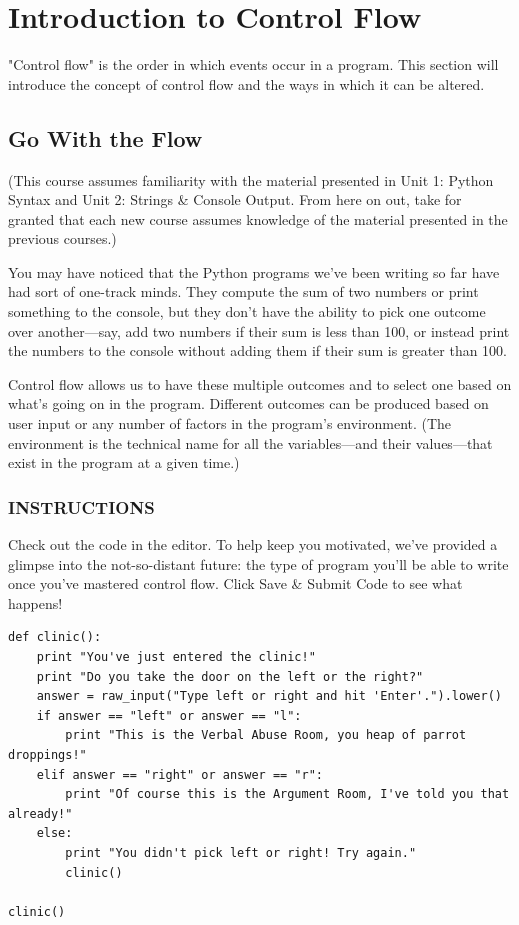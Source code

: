 \documentclass[12pt,a4paper,final,twoside,onecolumn,titlepage]{book}
\begin{document}
\section{Introduction to Control Flow}
"Control flow" is the order in which events occur in a program. This section will introduce the concept of control flow and the ways in which it can be altered.

\subsection{Go With the Flow}

(This course assumes familiarity with the material presented in Unit 1: Python Syntax and Unit 2: Strings \& Console Output. From here on out, take for granted that each new course assumes knowledge of the material presented in the previous courses.)

You may have noticed that the Python programs we've been writing so far have had sort of one-track minds. They compute the sum of two numbers or print something to the console, but they don't have the ability to pick one outcome over another—say, add two numbers if their sum is less than 100, or instead print the numbers to the console without adding them if their sum is greater than 100.

Control flow allows us to have these multiple outcomes and to select one based on what's going on in the program. Different outcomes can be produced based on user input or any number of factors in the program's environment. (The environment is the technical name for all the variables—and their values—that exist in the program at a given time.)

\subsubsection{INSTRUCTIONS}

Check out the code in the editor. To help keep you motivated, we've provided a glimpse into the not-so-distant future: the type of program you'll be able to write once you've mastered control flow. Click Save \& Submit Code to see what happens!

\begin{lstlisting}
def clinic():
    print "You've just entered the clinic!"
    print "Do you take the door on the left or the right?"
    answer = raw_input("Type left or right and hit 'Enter'.").lower()
    if answer == "left" or answer == "l":
        print "This is the Verbal Abuse Room, you heap of parrot droppings!"
    elif answer == "right" or answer == "r":
        print "Of course this is the Argument Room, I've told you that already!"
    else:
        print "You didn't pick left or right! Try again."
        clinic()

clinic()
\end{lstlisting}
    
\end{document}
